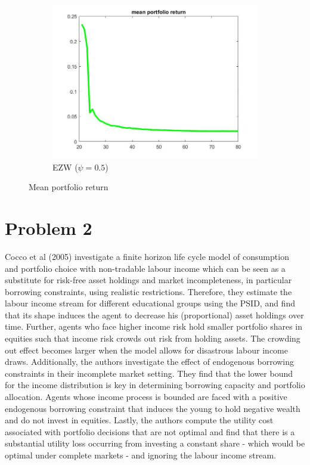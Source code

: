 \documentclass[12pt,a4paper]{article}
\begin{document}
\begin{figure}[h!]
\begin{subfigure}[b]{0.32\linewidth}
    \includegraphics[width=\linewidth]{graphs/Q4/mean_ret_ezw.jpg}
      \caption{EZW ($\psi = 0.5$)}
  \end{subfigure}
  \caption{Mean portfolio return}
    \label{fig:10}
\end{figure}

\pagebreak

\section*{Problem 2}

Cocco et al (2005) investigate a finite horizon life cycle model of consumption and portfolio choice with non-tradable labour income which can be seen as a substitute for risk-free asset holdings and market incompleteness, in particular borrowing constraints, using realistic restrictions. Therefore, they estimate the labour income stream for different educational groups using the PSID, and find that its shape induces the agent to decrease his (proportional) asset holdings over time. Further, agents who face higher income risk hold smaller portfolio shares in equities such that income risk crowds out risk from holding assets. The crowding out effect becomes larger when the model allows for disastrous labour income draws. Additionally, the authors investigate the effect of endogenous borrowing constraints in their incomplete market setting. They find that the lower bound for the income distribution is key in determining borrowing capacity and portfolio allocation. Agents whose income process is bounded are faced with a positive endogenous borrowing constraint that induces the young to hold negative wealth and do not invest in equities. Lastly, the authors compute the utility cost associated with portfolio decisions that are not optimal and find that there is a substantial utility loss occurring from investing a constant share - which would be optimal under complete markets - and ignoring the labour income stream.
\end{document}
